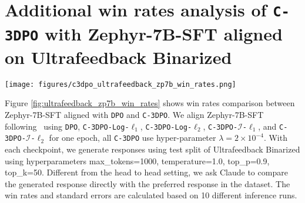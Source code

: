 \section{Additional win rates analysis of \texttt{C-3DPO} with \textrm{Zephyr-7B-SFT} aligned on \textrm{Ultrafeedback Binarized}} \label{win_rates_across_10_inferences_7b_ultrafeedback}
\begin{figure*}[h]
    \centering
    \texttt{[image: figures/c3dpo\_ultrafeedback\_zp7b\_win\_rates.png]}
    \caption{Win rates comparison of \textrm{Zephyr-7B-SFT} aligned on \textrm{Ultrafeedback Binarized} using \texttt{DPO} and \texttt{C-3DPO}. The first 4 plots show win rates of \texttt{C-3DPO} at individual checkpoints across 10 different inference runs. The last plot shows mean and standard error of win rates across all checkpoints and all inference runs.}
    \label{fig:ultrafeedback_zp7b_win_rates}
\end{figure*}
Figure \ref{fig:ultrafeedback_zp7b_win_rates} shows win rates comparison between \textrm{Zephyr-7B-SFT} aligned with \texttt{DPO} and \texttt{C-3DPO}. We align \textrm{Zephyr-7B-SFT} following~\citet{rasul2024preference} using \texttt{DPO}, \texttt{C-3DPO-Log-$\ell_1$}, \texttt{C-3DPO-Log-$\ell_2$}, \texttt{C-3DPO-$\mathcal{I}$-$\ell_1$}, and \texttt{C-3DPO-$\mathcal{I}$-$\ell_2$} for one epoch, all \texttt{C-3DPO} use hyper-parameter $\lambda=2\times 10^{-4}$. With each checkpoint, we generate responses using test split of \textrm{Ultrafeedback Binarized} using hyperparameters max\_tokens=1000, temperature=1.0, top\_p=0.9, top\_k=50. Different from the head to head setting, we ask Claude to compare the generated response directly with the preferred response in the dataset. The win rates and standard errors are calculated based on 10 different inference runs. 

